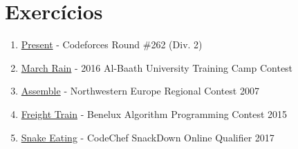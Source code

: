 \section{Exercícios}

\begin{enumerate}
  \item \href{https://codeforces.com/problemset/problem/460/C}{Present} - Codeforces Round \#262 (Div. 2)
  \item \href{https://codeforces.com/problemset/gymProblem/101028/I}{March Rain} - 2016 Al-Baath University Training Camp Contest
  \item \href{https://icpcarchive.ecs.baylor.edu/index.php?option=com_onlinejudge&Itemid=8&page=show_problem&problem=1972}{Assemble} - Northwestern Europe Regional Contest 2007
  \item \href{https://open.kattis.com/problems/freighttrain}{Freight Train} - Benelux Algorithm Programming Contest 2015
  \item \href{https://www.codechef.com/problems/SNAKEEAT}{Snake Eating} - CodeChef SnackDown Online Qualifier 2017
\end{enumerate}
